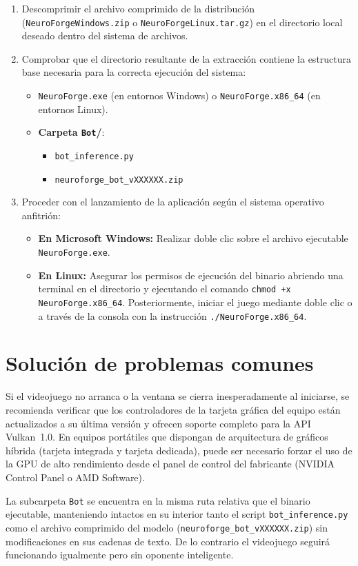 \begin{enumerate}
	\item Descomprimir el archivo comprimido de la distribución (\texttt{NeuroForgeWindows.zip} o \texttt{NeuroForgeLinux.tar.gz}) en el directorio local deseado dentro del sistema de archivos.
	\item Comprobar que el directorio resultante de la extracción contiene la estructura base necesaria para la correcta ejecución del sistema:
	\begin{itemize}
		\item \texttt{NeuroForge.exe} (en entornos Windows) o \texttt{NeuroForge.x86\_64} (en entornos Linux).
		\item \textbf{Carpeta \texttt{Bot}/}:
		\begin{itemize}
			\item \texttt{bot\_inference.py}
			\item \texttt{neuroforge\_bot\_vXXXXXX.zip}
		\end{itemize}
	\end{itemize}
	\item Proceder con el lanzamiento de la aplicación según el sistema operativo anfitrión:
	\begin{itemize}
		\item \textbf{En Microsoft Windows:} Realizar doble clic sobre el archivo ejecutable \texttt{NeuroForge.exe}.
		\item \textbf{En Linux:} Asegurar los permisos de ejecución del binario abriendo una terminal en el directorio y ejecutando el comando \texttt{chmod +x NeuroForge.x86\_64}. Posteriormente, iniciar el juego mediante doble clic o a través de la consola con la instrucción \texttt{./NeuroForge.x86\_64}.
	\end{itemize}
\end{enumerate}

\section{Solución de problemas comunes}

Si el videojuego no arranca o la ventana se cierra inesperadamente al iniciarse, se recomienda verificar que los controladores de la tarjeta gráfica del equipo están actualizados a su última versión y ofrecen soporte completo para la API Vulkan~1.0. En equipos portátiles que dispongan de arquitectura de gráficos híbrida (tarjeta integrada y tarjeta dedicada), puede ser necesario forzar el uso de la GPU de alto rendimiento desde el panel de control del fabricante (NVIDIA Control Panel o AMD Software).

La subcarpeta \texttt{Bot} se encuentra en la misma ruta relativa que el binario ejecutable, manteniendo intactos en su interior tanto el script \texttt{bot\_inference.py} como el archivo comprimido del modelo (\texttt{neuroforge\_bot\_vXXXXXX.zip}) sin modificaciones en sus cadenas de texto. De lo contrario el videojuego seguirá funcionando igualmente pero sin oponente inteligente.